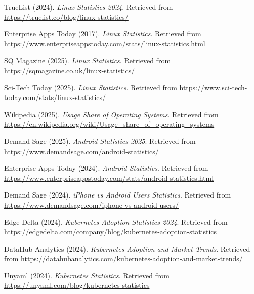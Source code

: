 \documentclass[10pt,a4paper]{article}
\begin{document}
\newpage

\begin{thebibliography}{99}


TrueList (2024).
\textit{Linux Statistics 2024}.
Retrieved from \url{https://truelist.co/blog/linux-statistics/}

Enterprise Apps Today (2017).
\textit{Linux Statistics}.
Retrieved from \url{https://www.enterpriseappstoday.com/stats/linux-statistics.html}

SQ Magazine (2025).
\textit{Linux Statistics}.
Retrieved from \url{https://sqmagazine.co.uk/linux-statistics/}

Sci-Tech Today (2025).
\textit{Linux Statistics}.
Retrieved from \url{https://www.sci-tech-today.com/stats/linux-statistics/}

Wikipedia (2025).
\textit{Usage Share of Operating Systems}.
Retrieved from \url{https://en.wikipedia.org/wiki/Usage_share_of_operating_systems}

Demand Sage (2025).
\textit{Android Statistics 2025}.
Retrieved from \url{https://www.demandsage.com/android-statistics/}

Enterprise Apps Today (2024).
\textit{Android Statistics}.
Retrieved from \url{https://www.enterpriseappstoday.com/stats/android-statistics.html}

Demand Sage (2024).
\textit{iPhone vs Android Users Statistics}.
Retrieved from \url{https://www.demandsage.com/iphone-vs-android-users/}

Edge Delta (2024).
\textit{Kubernetes Adoption Statistics 2024}.
Retrieved from \url{https://edgedelta.com/company/blog/kubernetes-adoption-statistics}

DataHub Analytics (2024).
\textit{Kubernetes Adoption and Market Trends}.
Retrieved from \url{https://datahubanalytics.com/kubernetes-adoption-and-market-trends/}

Unyaml (2024).
\textit{Kubernetes Statistics}.
Retrieved from \url{https://unyaml.com/blog/kubernetes-statistics}


\end{thebibliography}
\end{document}

